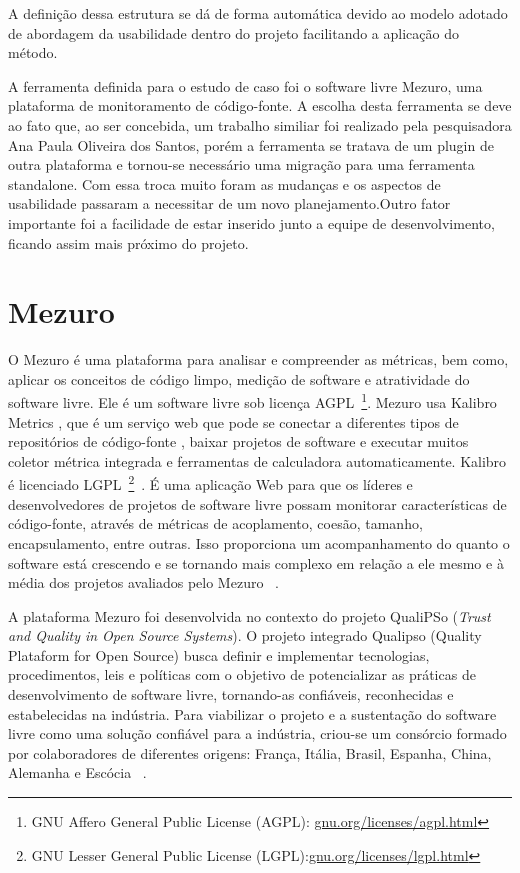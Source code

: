 %
A definição dessa estrutura se dá de forma automática devido ao modelo adotado de abordagem da usabilidade dentro do projeto facilitando a aplicação do método.

A ferramenta definida para o estudo de caso foi o software livre Mezuro, uma plataforma de monitoramento de código-fonte. A escolha desta ferramenta se deve ao fato que, ao ser concebida, um trabalho similiar foi realizado pela pesquisadora Ana Paula Oliveira dos Santos, porém a ferramenta se tratava de um plugin de outra plataforma e tornou-se necessário uma migração para uma ferramenta standalone. Com essa troca muito foram as mudanças e os aspectos de usabilidade passaram a necessitar de um novo planejamento.Outro fator importante foi a facilidade de estar inserido junto a equipe de desenvolvimento, ficando assim mais próximo do projeto.

\section{Mezuro}
\label{mezuro}
O Mezuro é uma plataforma para analisar e compreender as métricas, bem como, aplicar os conceitos de código limpo, medição de software e atratividade do software livre. Ele é um software livre sob licença AGPL~\footnote{GNU Affero General Public License (AGPL): \url{gnu.org/licenses/agpl.html}}. Mezuro usa Kalibro Metrics , que é um serviço web que pode se conectar a diferentes tipos de repositórios de código-fonte , baixar projetos de software e executar muitos coletor métrica integrada e ferramentas de calculadora automaticamente. Kalibro é licenciado LGPL~\footnote{GNU Lesser General Public License (LGPL):\url{gnu.org/licenses/lgpl.html}}~\cite{}.%
É uma aplicação Web para que os líderes e desenvolvedores de projetos de software livre possam monitorar características de código-fonte, através de métricas de acoplamento, coesão, tamanho, encapsulamento, entre outras. Isso proporciona um acompanhamento do quanto o software está crescendo e se tornando mais complexo em relação a ele mesmo e à média dos projetos avaliados pelo Mezuro~\cite{}%
.

A plataforma Mezuro foi desenvolvida no contexto do projeto QualiPSo (\textit{Trust and Quality in Open Source Systems}).
O projeto integrado Qualipso (Quality Plataform for Open Source) busca definir e implementar tecnologias, procedimentos, leis e políticas com o objetivo de potencializar as práticas de desenvolvimento de software livre, tornando-as confiáveis, reconhecidas e estabelecidas na indústria.
Para viabilizar o projeto e a sustentação do software livre como uma solução confiável para a indústria, criou-se um consórcio formado por colaboradores de diferentes origens: França, Itália, Brasil, Espanha, China, Alemanha e Escócia~\cite{}%
.

